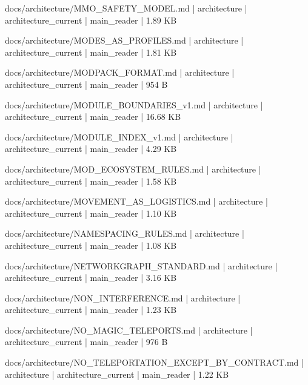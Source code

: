 \documentclass[11pt,a4paper]{report}
\begin{document}
{\small\ttfamily\raggedright docs/\allowbreak{}architecture/\allowbreak{}MMO\_SAFETY\_MODEL.\allowbreak{}md | architecture | architecture\_current | main\_reader | 1.\allowbreak{}89 KB\par}
{\small\ttfamily\raggedright docs/\allowbreak{}architecture/\allowbreak{}MODES\_AS\_PROFILES.\allowbreak{}md | architecture | architecture\_current | main\_reader | 1.\allowbreak{}81 KB\par}
{\small\ttfamily\raggedright docs/\allowbreak{}architecture/\allowbreak{}MODPACK\_FORMAT.\allowbreak{}md | architecture | architecture\_current | main\_reader | 954 B\par}
{\small\ttfamily\raggedright docs/\allowbreak{}architecture/\allowbreak{}MODULE\_BOUNDARIES\_v1.\allowbreak{}md | architecture | architecture\_current | main\_reader | 16.\allowbreak{}68 KB\par}
{\small\ttfamily\raggedright docs/\allowbreak{}architecture/\allowbreak{}MODULE\_INDEX\_v1.\allowbreak{}md | architecture | architecture\_current | main\_reader | 4.\allowbreak{}29 KB\par}
{\small\ttfamily\raggedright docs/\allowbreak{}architecture/\allowbreak{}MOD\_ECOSYSTEM\_RULES.\allowbreak{}md | architecture | architecture\_current | main\_reader | 1.\allowbreak{}58 KB\par}
{\small\ttfamily\raggedright docs/\allowbreak{}architecture/\allowbreak{}MOVEMENT\_AS\_LOGISTICS.\allowbreak{}md | architecture | architecture\_current | main\_reader | 1.\allowbreak{}10 KB\par}
{\small\ttfamily\raggedright docs/\allowbreak{}architecture/\allowbreak{}NAMESPACING\_RULES.\allowbreak{}md | architecture | architecture\_current | main\_reader | 1.\allowbreak{}08 KB\par}
{\small\ttfamily\raggedright docs/\allowbreak{}architecture/\allowbreak{}NETWORKGRAPH\_STANDARD.\allowbreak{}md | architecture | architecture\_current | main\_reader | 3.\allowbreak{}16 KB\par}
{\small\ttfamily\raggedright docs/\allowbreak{}architecture/\allowbreak{}NON\_INTERFERENCE.\allowbreak{}md | architecture | architecture\_current | main\_reader | 1.\allowbreak{}23 KB\par}
{\small\ttfamily\raggedright docs/\allowbreak{}architecture/\allowbreak{}NO\_MAGIC\_TELEPORTS.\allowbreak{}md | architecture | architecture\_current | main\_reader | 976 B\par}
{\small\ttfamily\raggedright docs/\allowbreak{}architecture/\allowbreak{}NO\_TELEPORTATION\_EXCEPT\_BY\_CONTRACT.\allowbreak{}md | architecture | architecture\_current | main\_reader | 1.\allowbreak{}22 KB\par}
\end{document}
